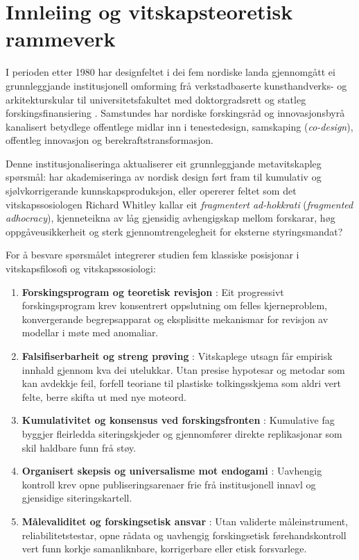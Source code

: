 \documentclass[11pt,a4paper]{article}
\begin{document}
\begin{abstract}
\medskip
\noindent\textbf{Nøkkelord:} metavitskap, bibliometri, nordisk designforsking, designteori, kumulativitet, falsifiserbarheit, forskingsetikk, siteringsnettverk, vektorsemantikk
\end{abstract}

\section{Innleiing og vitskapsteoretisk rammeverk}

I perioden etter 1980 har designfeltet i dei fem nordiske landa gjennomgått ei grunnleggjande institusjonell omforming frå verkstadbaserte kunsthandverks- og arkitekturskular til universitetsfakultet med doktorgradsrett og statleg forskingsfinansiering \cite{simon1969,cross2001,friedman2003,koskinen2011,redstrom2017}. Samstundes har nordiske forskingsråd og innovasjonsbyrå kanalisert betydlege offentlege midlar inn i tenestedesign, samskaping (\emph{co-design}), offentleg innovasjon og berekraftstransformasjon.

Denne institusjonaliseringa aktualiserer eit grunnleggjande metavitskapleg spørsmål: har akademiseringa av nordisk design ført fram til kumulativ og sjølvkorrigerande kunnskapsproduksjon, eller opererer feltet som det vitskapssosiologen Richard Whitley \cite{whitley2000} kallar eit \emph{fragmentert ad-hokkrati} (\emph{fragmented adhocracy}), kjenneteikna av låg gjensidig avhengigskap mellom forskarar, høg oppgåveusikkerheit og sterk gjennomtrengelegheit for eksterne styringsmandat?

For å besvare spørsmålet integrerer studien fem klassiske posisjonar i vitskapsfilosofi og vitskapssosiologi:
\begin{enumerate}
  \item \textbf{Forskingsprogram og teoretisk revisjon} \cite{lakatos1970}: Eit progressivt forskingsprogram krev konsentrert oppslutning om felles kjerneproblem, konvergerande begrepsapparat og eksplisitte mekanismar for revisjon av modellar i møte med anomaliar.
  \item \textbf{Falsifiserbarheit og streng prøving} \cite{popper1959,meehl1978,mayo2018}: Vitskaplege utsagn får empirisk innhald gjennom kva dei utelukkar. Utan presise hypotesar og metodar som kan avdekkje feil, forfell teoriane til plastiske tolkingsskjema som aldri vert felte, berre skifta ut med nye moteord.
  \item \textbf{Kumulativitet og konsensus ved forskingsfronten} \cite{price1965,cole1992}: Kumulative fag byggjer fleirledda siteringskjeder og gjennomfører direkte replikasjonar som skil haldbare funn frå støy.
  \item \textbf{Organisert skepsis og universalisme mot endogami} \cite{merton1973,ioannidis2005}: Uavhengig kontroll krev opne publiseringsarenaer frie frå institusjonell innavl og gjensidige siteringskartell.
  \item \textbf{Målevaliditet og forskingsetisk ansvar} \cite{flake2020,munafo2017}: Utan validerte måleinstrument, reliabilitetstestar, opne rådata og uavhengig forskingsetisk førehandskontroll vert funn korkje samanliknbare, korrigerbare eller etisk forsvarlege.
\end{enumerate}
\end{document}
